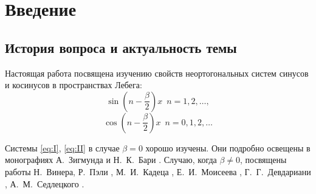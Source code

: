 ﻿\documentclass[oneside, final, 14pt]{extreport}
\begin{document}
\newcommand\sincoeffs{\int\limits_0^{\pi}\sin\left(n - \frac{\beta}{2}\right)xdx,
	\enspace n = 1, 2, \dots}
\newcommand\sinCNull{\int\limits_0^{\pi}f(x)\sin\left(n - \frac{\beta}{2}\right)xdx = 0,
	\enspace n = 1, 2, \dots}
\newcommand\mainFunc[1]{\left(\cos\frac{#1}{2}\right)^{-\beta-1}\sin\frac{#1}{2}}
\newcommand\msin[1]{\sin\left(n - \frac{\beta}{2}\right)#1}
\newcommand\msindots[1]{\sin\left(n - \frac{\beta}{2}\right)#1, n = 1, 2, \ldots}
\newcommand\mcos[1]{\cos\left(n - \frac{\beta}{2}\right)#1}
\newcommand\mCoeff{n - \frac{\beta}{2}}
\newcommand\Real{\operatorname{Re}}
\newcommand\Imag{\operatorname{Im}}
\newcommand\pv[1]{\mathrel{\stackrel{\makebox[0pt]{\mbox{\normalfont\tiny п.в.}}}{#1}}}
\newcommand\phisys[2]{\{\phi_#1(#2)\}}
\newcommand\bsin[1]{h_n^s(#1)=\frac{2}{\pi}\sum\limits_{k = 0}^{n - 1}C_{\beta}^k\sin(n - k)#1\Bigg(2\cos\left(\frac{\theta}{2}\right)\Bigg)^{-\beta}}
\newcommand\bcos[1]{h^c_k(#1) = \frac{2C^k_\beta}{\pi(2\cos\frac{#1}{2})^\beta}\Real\Bigg[F(-k; 1; \beta - k; -e^{i#1}) - \frac{1}{2}\Bigg]}





\setcounter{chapter}{1}
\chapter*{Введение}

\section{История вопроса и актуальность темы}
Настоящая работа посвящена изучению свойств неортогональных систем синусов и косинусов в пространствах Лебега:
\begin{equation}
	\msin{x} \enspace n = 1, 2, \dots, \tag{I}\label{eq:I}
\end{equation}
\begin{equation}
	\mcos{x} \enspace n = 0, 1, 2, \dots \tag{II}\label{eq:II}
\end{equation}

Системы \eqref{eq:I}, \eqref{eq:II} в случае $\beta = 0$ хорошо изучены. Они подробно освещены в монографиях
А.~Зигмунда \cite{zigmund} и Н.~К.~Бари \cite{bari}. Случаю, когда $\beta \neq 0$, посвящены работы 
Н.~Винера, Р.~Пэли \cite{paley-wiener}, М.~И.~Кадеца \cite{kadec}, Е.~И.~Моисеева \cite{moiseev-dan},
Г.~Г.~Девдариани \cite{devdariani}, А.~М.~Седлецкого \cite{moiseev-sedleckiy}.
\end{document}
